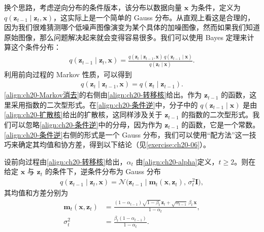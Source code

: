 \documentclass[../../main.tex]{subfiles}
\begin{document}
换个思路，考虑逆向分布的条件版本，该分布以数据向量 $\bm{x}$ 为条件，定义为 $q(\bm{z}_{t-1}\mid\bm{z}_t,\bm{x})$，这实际上是一个简单的 Gauss 分布。从直观上看这是合理的，因为我们很难猜测哪个低噪声图像演变为某个具体的加噪图像，然而如果我们知道原始图像，那么问题解决起来就会变得容易很多。我们可以使用 Bayes 定理来计算这个条件分布：
\begin{align}
q(\bm{z}_{t-1}\mid\bm{z}_t,\bm{x})=\frac{q(\bm{z}_t\mid\bm{z}_{t-1},\bm{x})\,q(\bm{z}_{t-1}\mid\bm{x})}{q(\bm{z}_t\mid\bm{x})}.
\label{align:ch20-条件逆}
\end{align}
利用前向过程的 Markov 性质，可以得到
\begin{align}
q(\bm{z}_t\mid\bm{z}_{t-1},\bm{x})=q(\bm{z}_t\mid\bm{z}_{t-1}).
\label{align:ch20-Markov消去}
\end{align}
\eqref{align:ch20-Markov消去}的右侧由\eqref{align:ch20-转移核}给出。作为 $\bm{z}_{t-1}$ 的函数，这里采用指数的二次型形式。在\eqref{align:ch20-条件逆}中，分子中的 $q(\bm{z}_{t-1}\mid\bm{x})$ 是由\eqref{align:ch20-扩散核}给出的扩散核，这同样涉及关于 $\bm{z}_{t-1}$ 的指数的二次型形式。我们可以忽略\eqref{align:ch20-条件逆}中的分母，因为作为 $\bm{z}_{t-1}$ 的函数，它是一个常数。\eqref{align:ch20-条件逆}右侧的形式是一个 Gauss 分布，我们可以使用“配方法”这一技巧来确定其均值和协方差，得到以下结论（见\cref{exercise:ch20-06}）。

\begin{proposition}\label{proposition:ch20-逆条件分布}
设前向过程由\eqref{align:ch20-转移核}给出，$\alpha_t$ 由\eqref{align:ch20-alpha}定义，$t\geqslant 2$。则在给定 $\bm{x}$ 与 $\bm{z}_t$ 的条件下，逆条件分布为 Gauss 分布
\begin{align}
q(\bm{z}_{t-1}\mid\bm{z}_t,\bm{x})=\mathcal{N}\big(\bm{z}_{t-1}\mid\bm{m}_t(\bm{x},\bm{z}_t),\,\sigma_t^2\bm{I}\big),
\label{align:ch20-逆条件}
\end{align}
其均值和方差分别为
\begin{align}
\bm{m}_t(\bm{x},\bm{z}_t)&=\frac{(1-\alpha_{t-1})\sqrt{1-\beta_t}\,\bm{z}_t+\sqrt{\alpha_{t-1}}\,\beta_t\,\bm{x}}{1-\alpha_t},
\label{align:ch20-逆均值}\\
\sigma_t^2&=\frac{\beta_t(1-\alpha_{t-1})}{1-\alpha_t}.
\label{align:ch20-逆方差}
\end{align}
\end{proposition}
\end{document}
